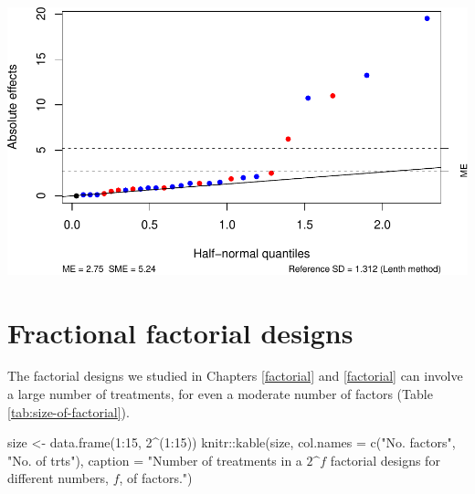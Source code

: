 \documentclass[
]{book}
\newenvironment{Shaded}{\begin{snugshade}}{\end{snugshade}}
\newcommand{\AttributeTok}[1]{\textcolor[rgb]{0.77,0.63,0.00}{#1}}
\newcommand{\DecValTok}[1]{\textcolor[rgb]{0.00,0.00,0.81}{#1}}
\newcommand{\FloatTok}[1]{\textcolor[rgb]{0.00,0.00,0.81}{#1}}
\newcommand{\FunctionTok}[1]{\textcolor[rgb]{0.00,0.00,0.00}{#1}}
\newcommand{\NormalTok}[1]{#1}
\newcommand{\OtherTok}[1]{\textcolor[rgb]{0.56,0.35,0.01}{#1}}
\newcommand{\SpecialCharTok}[1]{\textcolor[rgb]{0.00,0.00,0.00}{#1}}
\newcommand{\StringTok}[1]{\textcolor[rgb]{0.31,0.60,0.02}{#1}}
\theoremstyle{definition}
\theoremstyle{definition}
\theoremstyle{definition}
\theoremstyle{definition}
\theoremstyle{remark}
\begin{document}
\begin{Shaded}
\end{Shaded}

\includegraphics{bookdown_math3014-6027_files/figure-latex/block-4-lenth-1.pdf}

\hypertarget{fractional-factorial}{%
\chapter{Fractional factorial designs}\label{fractional-factorial}}

The factorial designs we studied in Chapters \ref{factorial} and \ref{factorial} can involve a large number of treatments, for even a moderate number of factors (Table \ref{tab:size-of-factorial}).

\begin{Shaded}
\begin{Highlighting}[]
\NormalTok{size }\OtherTok{\textless{}{-}} \FunctionTok{data.frame}\NormalTok{(}\DecValTok{1}\SpecialCharTok{:}\DecValTok{15}\NormalTok{, }\DecValTok{2}\SpecialCharTok{\^{}}\NormalTok{(}\DecValTok{1}\SpecialCharTok{:}\DecValTok{15}\NormalTok{))}
\NormalTok{knitr}\SpecialCharTok{::}\FunctionTok{kable}\NormalTok{(size, }\AttributeTok{col.names =} \FunctionTok{c}\NormalTok{(}\StringTok{"No. factors"}\NormalTok{, }\StringTok{"No. of trts"}\NormalTok{), }\AttributeTok{caption =} \StringTok{"Number of treatments in a $2\^{}f$ factorial designs for different numbers, $f$, of factors."}\NormalTok{)}
\end{Highlighting}
\end{Shaded}
\end{document}
